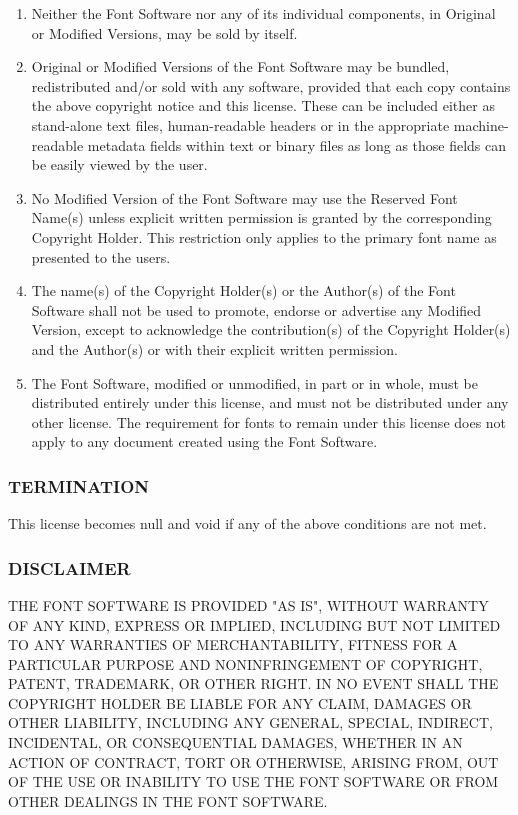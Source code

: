 \documentclass[a4paper]{article}
\begin{document}
\begin{enumerate}
\item Neither the Font Software nor any of its individual components,
in Original or Modified Versions, may be sold by itself.

\item Original or Modified Versions of the Font Software may be bundled,
redistributed and/or sold with any software, provided that each copy
contains the above copyright notice and this license. These can be
included either as stand-alone text files, human-readable headers or
in the appropriate machine-readable metadata fields within text or
binary files as long as those fields can be easily viewed by the user.

\item  No Modified Version of the Font Software may use the Reserved Font
Name(s) unless explicit written permission is granted by the corresponding
Copyright Holder. This restriction only applies to the primary font name as
presented to the users.

\item  The name(s) of the Copyright Holder(s) or the Author(s) of the Font
Software shall not be used to promote, endorse or advertise any
Modified Version, except to acknowledge the contribution(s) of the
Copyright Holder(s) and the Author(s) or with their explicit written
permission.

\item The Font Software, modified or unmodified, in part or in whole,
must be distributed entirely under this license, and must not be
distributed under any other license. The requirement for fonts to
remain under this license does not apply to any document created
using the Font Software.


\end{enumerate}


\subsubsection*{TERMINATION}

This license becomes null and void if any of the above conditions are
not met.

\subsubsection*{DISCLAIMER}

THE FONT SOFTWARE IS PROVIDED "AS IS", WITHOUT WARRANTY OF ANY KIND,
EXPRESS OR IMPLIED, INCLUDING BUT NOT LIMITED TO ANY WARRANTIES OF
MERCHANTABILITY, FITNESS FOR A PARTICULAR PURPOSE AND NONINFRINGEMENT
OF COPYRIGHT, PATENT, TRADEMARK, OR OTHER RIGHT. IN NO EVENT SHALL THE
COPYRIGHT HOLDER BE LIABLE FOR ANY CLAIM, DAMAGES OR OTHER LIABILITY,
INCLUDING ANY GENERAL, SPECIAL, INDIRECT, INCIDENTAL, OR CONSEQUENTIAL
DAMAGES, WHETHER IN AN ACTION OF CONTRACT, TORT OR OTHERWISE, ARISING
FROM, OUT OF THE USE OR INABILITY TO USE THE FONT SOFTWARE OR FROM
OTHER DEALINGS IN THE FONT SOFTWARE.



\end{document}
